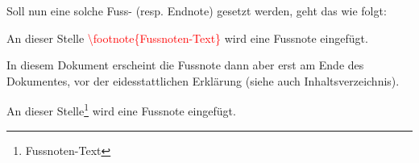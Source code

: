 Soll nun eine solche Fuss- (resp. Endnote) gesetzt werden, geht das wie folgt:

\begin{tcolorbox}[width=\textwidth,colback={light-gray},title={Latex-Text},colbacktitle=gray,coltitle=white]

An dieser Stelle \textcolor{red}{\textbackslash{footnote\{Fussnoten-Text\}}} wird eine Fussnote eingefügt.

\end{tcolorbox}


In diesem Dokument erscheint die Fussnote dann aber erst am Ende des Dokumentes, vor der eidesstattlichen Erklärung (siehe auch Inhaltsverzeichnis).

\begin{tcolorbox}[width=\textwidth,colback={light-gray},title={Print-Text},colbacktitle=gray,coltitle=white]

An dieser Stelle\footnote{Fussnoten-Text} wird eine Fussnote eingefügt.

\end{tcolorbox}
